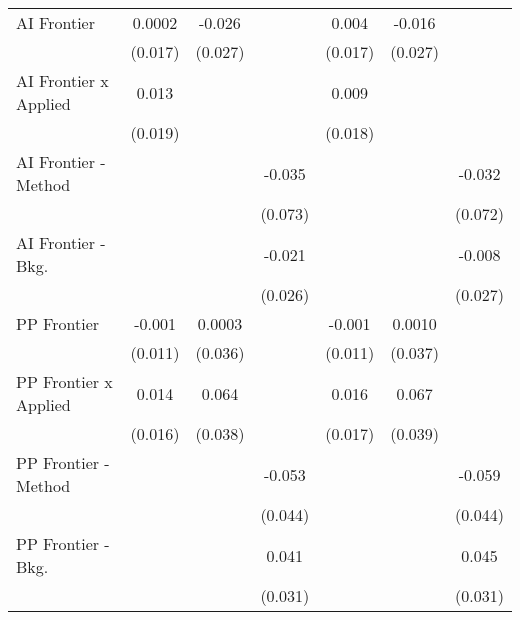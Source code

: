 \begin{tabular}{lcccccc}
   AI Frontier                    & 0.0002         & -0.026       &             & 0.004          & -0.016       &   \\   
                                  & (0.017)        & (0.027)      &             & (0.017)        & (0.027)      &   \\   
   AI Frontier x Applied          & 0.013          &              &             & 0.009          &              &   \\   
                                  & (0.019)        &              &             & (0.018)        &              &   \\   
   AI Frontier - Method           &                &              & -0.035      &                &              & -0.032\\   
                                  &                &              & (0.073)     &                &              & (0.072)\\   
   AI Frontier - Bkg.             &                &              & -0.021      &                &              & -0.008\\   
                                  &                &              & (0.026)     &                &              & (0.027)\\   
   PP Frontier                    & -0.001         & 0.0003       &             & -0.001         & 0.0010       &   \\   
                                  & (0.011)        & (0.036)      &             & (0.011)        & (0.037)      &   \\   
   PP Frontier x Applied          & 0.014          & 0.064        &             & 0.016          & 0.067        &   \\   
                                  & (0.016)        & (0.038)      &             & (0.017)        & (0.039)      &   \\   
   PP Frontier - Method           &                &              & -0.053      &                &              & -0.059\\   
                                  &                &              & (0.044)     &                &              & (0.044)\\   
   PP Frontier - Bkg.             &                &              & 0.041       &                &              & 0.045\\   
                                  &                &              & (0.031)     &                &              & (0.031)\\   

\end{tabular}
